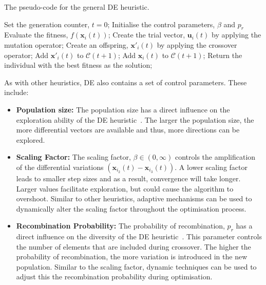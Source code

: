 \begin{algorithm}[htbp]
	\caption{The pseudo-code for the general \acs{DE} heuristic.}
	\label{algo:heuristics:de:general_de}
	\begin{algorithmic}
		\State Set the generation counter, $t = 0$;
		\State Initialise the control parameters, $\beta$ and $p_{r}$
		\State Evaluate the fitness, $f(\boldsymbol{x}_{i}(t))$;
		\State Create the trial vector, $\boldsymbol{u}_{i}(t)$ by applying the mutation operator;
		\State Create an offspring, $\boldsymbol{x}'_{i}(t)$ by applying the crossover operator;
		\State Add $\boldsymbol{x}'_{i}(t)$ to $\mathcal{C}(t+1)$;
		\Else
		\State Add $\boldsymbol{x}_{i}(t)$ to $\mathcal{C}(t+1)$;
		\EndIf
		\EndFor
		\EndWhile
		\State Return the individual with the best fitness as the solution;
	\end{algorithmic}
\end{algorithm}

As with other heuristics, \acs{DE} also contains a set of control parameters. These include:

\begin{itemize}
	\item \textbf{Population size:} The population size has a direct influence on the exploration ability of the \acs{DE} heuristic~\cite{ref:engelbrecht:2007}. The larger the population size, the more differential vectors are available and thus, more directions can be explored.

	\item \textbf{Scaling Factor:} The scaling factor, $\beta \in (0, \infty)$ controls the amplification of the differential variations $(\boldsymbol{x}_{i_{2}}(t) - \boldsymbol{x}_{i_{3}}(t))$. A lower scaling factor leads to smaller step sizes and as a result, convergence will take longer. Larger values facilitate exploration, but could cause the algorithm to overshoot. Similar to other heuristics, adaptive mechanisms can be used to dynamically alter the scaling factor throughout the optimisation process.

	\item \textbf{Recombination Probability:} The probability of recombination, $p_{r}$ has a direct influence on the diversity of the \acs{DE} heuristic~\cite{ref:engelbrecht:2007}. This parameter controls the number of elements that are included during crossover. The higher the probability of recombination, the more variation is introduced in the new population. Similar to the scaling factor, dynamic techniques can be used to adjust this the recombination probability during optimisation.
\end{itemize}


